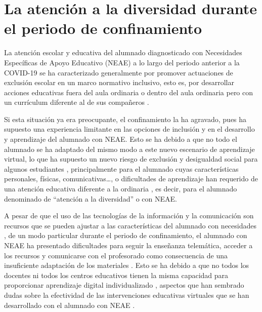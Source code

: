 \documentclass[spanish]{textolivre}
\begin{document}
\section{La atención a la diversidad durante el periodo de confinamiento}
La atención escolar y educativa del alumnado diagnosticado con Necesidades Específicas de Apoyo Educativo (NEAE) a lo largo del periodo anterior a la COVID-19 se ha caracterizado generalmente por promover actuaciones de exclusión escolar en un marco normativo inclusivo, esto es, por desarrollar acciones educativas fuera del aula ordinaria \cite{gonzalescortesmanas2020, manasgonzalescortes2020, morina2010} %
o dentro del aula ordinaria pero con un currículum diferente al de sus compañeros \cite{arnaiz2011}. %

Si esta situación ya era preocupante, el confinamiento la ha agravado, pues ha supuesto una experiencia limitante en las opciones de inclusión y en el desarrollo y aprendizaje del alumnado con NEAE. Esto se ha debido a que no todo el alumnado se ha adaptado del mismo modo a este nuevo escenario de aprendizaje virtual, lo que ha supuesto un nuevo riesgo de exclusión y desigualdad social para algunos estudiantes \cite{cabrera2020, echeita2020}, %
principalmente para el alumnado cuyas características personales, físicas, comunicativas…, o dificultades de aprendizaje han requerido de una atención educativa diferente a la ordinaria \cite{menendez2020}, %
es decir, para el alumnado denominado de “atención a la diversidad” \cite{agredamontoro2016} %
o con NEAE.

A pesar de que el uso de las tecnologías de la información y la comunicación son recursos que se pueden ajustar a las características del alumnado con necesidades \cite{campossoto2017}, %
de un modo particular durante el periodo de confinamiento, el alumnado con NEAE ha presentado dificultades para seguir la enseñanza telemática, acceder a los recursos y comunicarse con el profesorado como consecuencia de una insuficiente adaptación de los materiales \cite{berastegui2020}. %
Esto se ha debido a que no todos los docentes ni todos los centros educativos tienen la misma capacidad para proporcionar aprendizaje digital individualizado \cite{rogero2020}, %
aspectos que han sembrado dudas sobre la efectividad de las intervenciones educativas virtuales que se han desarrollado con el alumnado con NEAE \cite{menendez2020}. %
\end{document}
